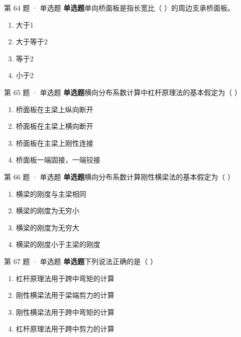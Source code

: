 \documentclass[UTF8,zihao=-4,openany]{ctexbook}
\newenvironment{choices}{\begin{enumerate}[label=\Alph*.,leftmargin=9mm,labelsep=3mm,itemsep=2pt,topsep=4pt]}{\end{enumerate}}
\newcommand{\qtype}[1]{\textcolor{brand}{\sffamily\bfseries #1}}
\begin{document}
\begin{questionbox}{第 64 题 · 单选题}
\qtype{单选题}\quad 单向桥面板是指长宽比（ ）的周边支承桥面板。
\begin{choices}
\item 大于1
\item 大于等于2
\item 等于2
\item 小于2
\end{choices}
\end{questionbox}

\begin{questionbox}{第 65 题 · 单选题}
\qtype{单选题}\quad 横向分布系数计算中杠杆原理法的基本假定为（ ）
\begin{choices}
\item 桥面板在主梁上纵向断开
\item 桥面板在主梁上横向断开
\item 桥面板在主梁上刚性连接
\item 桥面板一端固接，一端铰接
\end{choices}
\end{questionbox}

\begin{questionbox}{第 66 题 · 单选题}
\qtype{单选题}\quad 横向分布系数计算刚性横梁法的基本假定为（ ）
\begin{choices}
\item 横梁的刚度与主梁相同
\item 横梁的刚度为无穷小
\item 横梁的刚度为无穷大
\item 横梁的刚度小于主梁的刚度
\end{choices}
\end{questionbox}

\begin{questionbox}{第 67 题 · 单选题}
\qtype{单选题}\quad 下列说法正确的是（ ）
\begin{choices}
\item 杠杆原理法用于跨中弯矩的计算
\item 刚性横梁法用于梁端剪力的计算
\item 刚性横梁法用于跨中弯矩的计算
\item 杠杆原理法用于跨中剪力的计算
\end{choices}
\end{questionbox}
\end{document}
